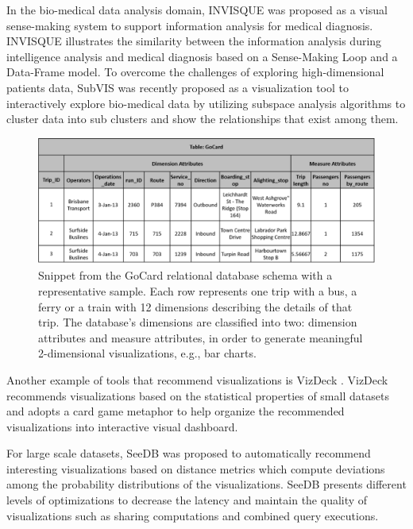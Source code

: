 In the bio-medical data analysis domain, INVISQUE \cite{Wong2011,DBLP:conf/chi/WongCKRX11} was proposed as a visual sense-making system to support information analysis for medical diagnosis. 
%
INVISQUE illustrates the similarity between the information analysis during intelligence analysis and medical diagnosis based on a Sense-Making Loop and a Data-Frame model.
%
To overcome the challenges of exploring high-dimensional patients data,  SubVIS \cite{Hund2016} was recently proposed as a visualization tool to interactively explore bio-medical data by utilizing subspace analysis algorithms to cluster data into sub clusters and show the relationships that exist among them.
%
\begin{figure}[t]
  \centering
    \includegraphics[width=\textwidth]{gocard_schemaandsample.png}
    \caption{Snippet from the GoCard relational database schema with a representative sample. Each row represents one trip with a bus, a ferry or a train with 12 dimensions describing the details of that trip. 
		The database's dimensions are classified into two: dimension attributes and measure attributes, in order to generate meaningful 2-dimensional visualizations, e.g., bar charts.
		}
    \label{fig:gocard_schemaandsample}
\end{figure}

Another example of tools that recommend visualizations is VizDeck \cite{DBLP:conf/sigmod/KeyHPA12}. 
%
VizDeck recommends visualizations based on the statistical properties of small datasets and adopts a card game metaphor 
to help organize the recommended visualizations into interactive visual dashboard.
%
%

For large scale datasets, SeeDB \cite{DBLP:journals/pvldb/VartakMPP14} was proposed to automatically recommend interesting visualizations based on distance metrics which compute deviations among the probability distributions of the 
visualizations. 
%
SeeDB presents different levels of optimizations to decrease the latency and maintain the quality of visualizations such as sharing computations and combined query executions.
%

